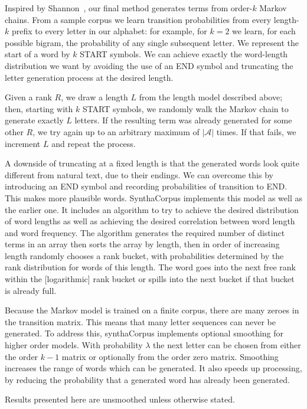\documentclass[11pt]{report}
\begin{document}
Inspired by Shannon~\cite{Shannon1948}, our final method generates
terms from order-$k$ Markov chains. From a sample corpus we learn
transition probabilities from every length-$k$ prefix to every letter
in our alphabet: for example, for $k=2$ we learn, for each possible
bigram, the probability of any single subsequent letter. We represent
the start of a word by $k$ START symbols.  We can achieve exactly the
word-length distribution we want by avoiding the use of an END symbol
and truncating the letter generation process at the desired length.

Given a rank $R$, we draw a length $L$ from the length model described
above; then, starting with $k$ START symbols, we randomly walk the
Markov chain to generate exactly $L$ letters. If the resulting term
was already generated for some other $R$, we try again up to an arbitrary
maximum of $|\mathcal{A}|$ times. If that fails, we increment $L$ and repeat
the process.

A downside of truncating at a fixed length is that the generated words look
quite different from natural text, due to their endings.  We can
overcome this by introducing an END symbol and recording probabilities
of transition to END.  This makes more plausible words.  SynthaCorpus
implements this model as well as the earlier one.  It includes an
algorithm to try to achieve the desired distribution of word lengths
as well as achieving the desired correlation between word length and
word frequency.  The algorithm generates the required number of
distinct terms in an array then sorts the array by length, then
in order of increasing length randomly chooses a rank
bucket, with probabilities determined by the rank distribution for
words of this length.  The word goes into the next free rank within
the [logarithmic] rank bucket or spills into the next bucket if that
bucket is already full.

Because the Markov model is trained on a finite corpus, there are
many zeroes in the transition matrix.  This means that many letter
sequences can never be generated.  To address this, synthaCorpus
implements optional smoothing for higher order models.
With probability $\lambda$ the next letter can be chosen from either
the order $k - 1$ matrix or optionally from the order zero matrix. 
Smoothing increases the range of
words which can be generated. It also speeds up processing, by
reducing the probability that a generated word has already been
generated.

Results
presented here are unsmoothed unless otherwise stated.
\end{document}
